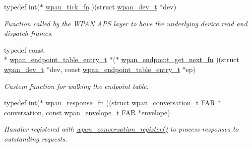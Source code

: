 \begin{DoxyCompactItemize}
typedef int($\ast$ \hyperlink{group__wpan__aps_gaf47f19bd0615a2edf5ec38e7025fdc35}{wpan\-\_\-tick\-\_\-fn} )(struct \hyperlink{structwpan__dev__t}{wpan\-\_\-dev\-\_\-t} $\ast$dev)
\begin{DoxyCompactList}\small\item\em Function called by the W\-P\-A\-N A\-P\-S layer to have the underlying device read and dispatch frames. \end{DoxyCompactList}\item 
typedef const \\*
\hyperlink{structwpan__endpoint__table__entry__t}{wpan\-\_\-endpoint\-\_\-table\-\_\-entry\-\_\-t} $\ast$($\ast$ \hyperlink{group__wpan__aps_ga2f83e173b0da6f1d3c161d93653681b5}{wpan\-\_\-endpoint\-\_\-get\-\_\-next\-\_\-fn} )(struct \hyperlink{structwpan__dev__t}{wpan\-\_\-dev\-\_\-t} $\ast$dev, const \hyperlink{structwpan__endpoint__table__entry__t}{wpan\-\_\-endpoint\-\_\-table\-\_\-entry\-\_\-t} $\ast$ep)
\begin{DoxyCompactList}\small\item\em Custom function for walking the endpoint table. \end{DoxyCompactList}\item 
typedef int($\ast$ \hyperlink{group__wpan__aps_gaffe7bb679e9ba6de49f68fdc584fbefb}{wpan\-\_\-response\-\_\-fn} )(struct \hyperlink{structwpan__conversation__t}{wpan\-\_\-conversation\-\_\-t} \hyperlink{group__hal_gaef060b3456fdcc093a7210a762d5f2ed}{F\-A\-R} $\ast$conversation, const \hyperlink{structwpan__envelope__t}{wpan\-\_\-envelope\-\_\-t} \hyperlink{group__hal_gaef060b3456fdcc093a7210a762d5f2ed}{F\-A\-R} $\ast$envelope)
\begin{DoxyCompactList}\small\item\em Handler registered with \hyperlink{group__wpan__aps_gae5f88ed40bd334d963e261947b77b980}{wpan\-\_\-conversation\-\_\-register()} to process responses to outstanding requests. \end{DoxyCompactList}\end{DoxyCompactItemize}
